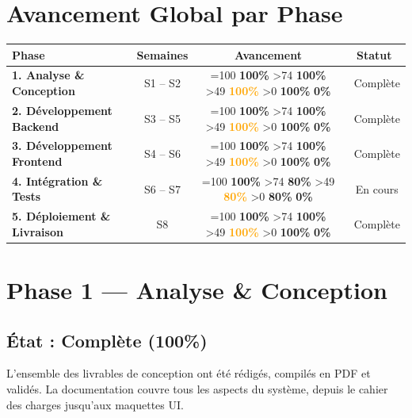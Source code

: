 \documentclass[12pt,a4paper]{article}
\newcommand{\cmark}{\textcolor{vert}{\ding{51}}}
\newcommand{\wmark}{\textcolor{orange}{\ding{115}}}
\newcommand{\statut}[1]{%
  \ifnum#1=100 \cellcolor{vertclair}\textbf{\textcolor{vert}{100\%}}%
  \else\ifnum#1>74 \cellcolor{vertclair}\textbf{\textcolor{vert}{#1\%}}%
  \else\ifnum#1>49 \cellcolor{orangeclair}\textbf{\textcolor{orange}{#1\%}}%
  \else\ifnum#1>0 \cellcolor{rougeclair}\textbf{\textcolor{rouge}{#1\%}}%
  \else \cellcolor{rougeclair}\textbf{\textcolor{rouge}{0\%}}%
  \fi\fi\fi\fi%
}
\begin{document}
\begin{center}
\end{center}

\section{Avancement Global par Phase}

\begin{center}
\renewcommand{\arraystretch}{1.4}
\begin{tabular}{|>{\bfseries}l|c|c|c|}
\hline
\rowcolor{bleu!15}
\textbf{Phase} & \textbf{Semaines} & \textbf{Avancement} & \textbf{Statut} \\
\hline
1. Analyse \& Conception & S1 -- S2 & \statut{100} & \cmark~Complète \\
\hline
2. Développement Backend & S3 -- S5 & \statut{100} & \cmark~Complète \\
\hline
3. Développement Frontend & S4 -- S6 & \statut{100} & \cmark~Complète \\
\hline
4. Intégration \& Tests & S6 -- S7 & \statut{80} & \wmark~En cours \\
\hline
5. Déploiement \& Livraison & S8 & \statut{100} & \cmark~Complète \\
\hline
\end{tabular}
\end{center}

\section{Phase 1 — Analyse \& Conception}

\subsection{État : \textcolor{vert}{Complète (100\%)}}

L'ensemble des livrables de conception ont été rédigés, compilés en PDF et validés. La documentation couvre tous les aspects du système, depuis le cahier des charges jusqu'aux maquettes UI.
\end{document}
